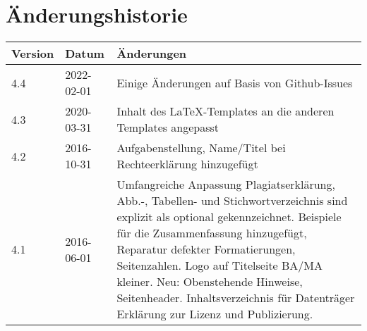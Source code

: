 \section*{Änderungshistorie}


\begin{tabularx}{\textwidth}{@{}llX@{}}
\toprule
\bfseries Version & \bfseries Datum & \bfseries Änderungen \\
\midrule
4.4 & 2022-02-01 & Einige Änderungen auf Basis von Github-Issues \\
\midrule
4.3 & 2020-03-31 & Inhalt des \LaTeX-Templates an die anderen Templates angepasst \\
\midrule
4.2 & 2016-10-31 & Aufgabenstellung, Name/Titel bei Rechteerklärung hinzugefügt \\
\midrule
4.1 & 2016-06-01 & Umfangreiche Anpassung Plagiatserklärung, Abb.-, Tabellen- und Stichwortverzeichnis sind explizit als optional gekennzeichnet. Beispiele für die Zusammenfassung hinzugefügt, Reparatur defekter Formatierungen, Seitenzahlen. Logo auf Titelseite BA/MA kleiner.
Neu: Obenstehende Hinweise, Seitenheader. Inhaltsverzeichnis für Datenträger Erklärung zur Lizenz und Publizierung. \\
\bottomrule
\end{tabularx}
